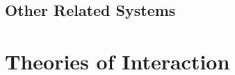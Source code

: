 \subsection{Other Related Systems}


\section{Theories of Interaction}

\cite{Huizinga1949}
\cite{Bernstein1998}


%
%
%
%
%
%
%
